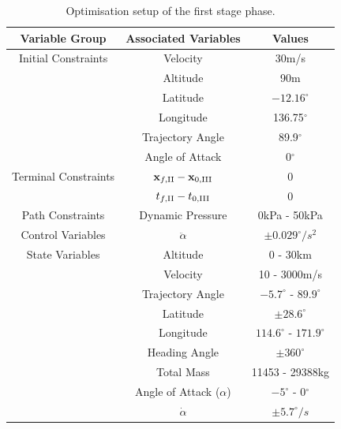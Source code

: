 \begin{table}[ht]
\centering
\begin{tabular}{|c|c|c|}
	\hline \textbf{Variable Group}  & \textbf{Associated Variables} & \textbf{Values}\\
	\hline Initial Constraints  & Velocity & 30m/s\\ & Altitude& 90m \\ & Latitude & $-12.16^\circ$ \\& Longitude & 136.75$^\circ$\\ & Trajectory Angle & 89.9$^\circ$\\ & Angle of Attack& 0$^\circ$\\
	\hline Terminal Constraints & $\textbf{x}_{f,\textrm{\rom{2}}} - \textbf{x}_{0,\textrm{\rom{3}}}$ & 0\\ & $t_{f,\textrm{\rom{2}}} - t_{0,\textrm{\rom{3}}}$ & 0\\
	\hline Path Constraints & Dynamic Pressure & 0kPa - 50kPa\\ 
		\hline Control Variables & $\ddot{\alpha}$ & $\pm0.029^\circ/s^2$\\ 
		\hline State Variables & Altitude & 0 - 30km\\ & Velocity& 10 - 3000m/s\\ & Trajectory Angle& $-5.7^\circ$ - $89.9^\circ$ \\   & Latitude& $\pm28.6^\circ$ \\  & Longitude& $114.6^\circ$ - $171.9^\circ$\\   & Heading Angle& $\pm360^\circ$\\  & Total Mass& 11453 - 29388kg \\  & Angle of Attack ($\alpha$)&  $-5^\circ$ - 0$^\circ$\\  & $\dot{\alpha}$& $\pm5.7^\circ/s$\\ 
	\hline 
\end{tabular} 

\caption{Optimisation setup of the first stage phase. }
\label{tab:1ststagesetup}
\end{table}



